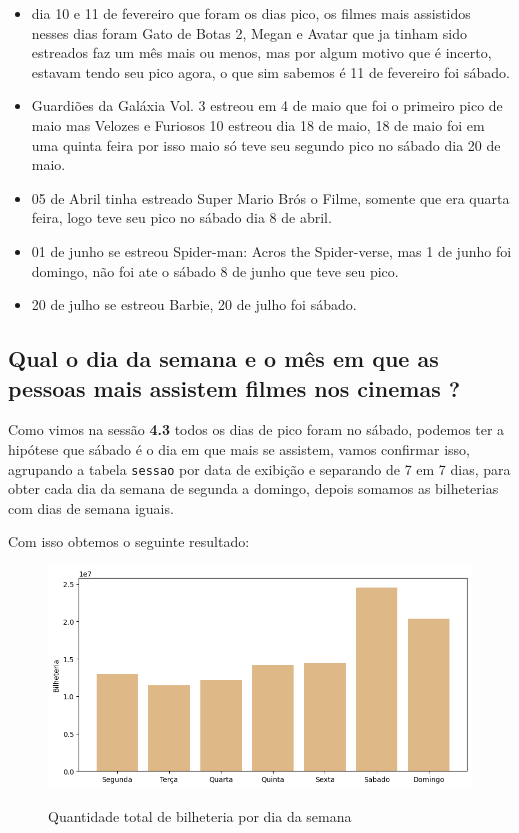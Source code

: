\documentclass[12pt, a4paper]{article}
\begin{document}
\begin{itemize}

    \item dia 10 e 11 de fevereiro que foram os dias pico, os filmes mais assistidos nesses dias foram Gato de Botas 2, Megan e Avatar que ja tinham sido estreados faz um mês mais ou menos, mas por algum motivo que é incerto, estavam tendo seu pico agora, o que sim sabemos é 11 de fevereiro foi sábado.
    \item Guardiões da Galáxia Vol. 3 estreou em 4 de maio que foi o primeiro pico de maio mas Velozes e Furiosos 10 estreou dia 18 de maio, 18 de maio foi em uma quinta feira por isso maio só teve seu segundo pico no sábado dia 20 de maio.
    \item05 de Abril tinha estreado Super Mario Brós o Filme, somente que era quarta feira, logo teve seu pico no sábado dia 8 de abril.
    \item01 de junho se estreou Spider-man: Acros the Spider-verse, mas 1 de junho foi domingo, não foi ate o sábado 8 de junho que teve seu pico.
    \item20 de julho se estreou Barbie, 20 de julho foi sábado.
\end{itemize}

\subsection{Qual o dia da semana e o mês em que as pessoas mais assistem filmes nos cinemas ?}

Como vimos na sessão \textbf{4.3} todos os dias de pico foram no sábado, podemos ter a hipótese que sábado é o dia em que mais se assistem, vamos confirmar isso, agrupando a tabela \texttt{sessao} por data de exibição e separando de 7 em 7 dias, para obter cada dia da semana de segunda a domingo, depois somamos as bilheterias com dias de semana iguais.

Com isso obtemos o seguinte resultado:

\newpage

\begin{figure}[h]
    \centering
    \includegraphics[width=1\textwidth]{bilheteria_dia_semana.png}%
    \label{fig:bilhetereria_dia_semana}
    \caption{Quantidade total de bilheteria por dia da semana }
\end{figure}
\end{document}
